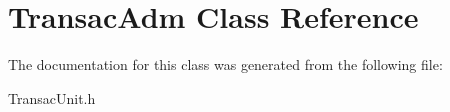 \hypertarget{classTransacAdm}{\section{Transac\-Adm Class Reference}
\label{da/deb/classTransacAdm}
}


The documentation for this class was generated from the following file\-:\begin{DoxyCompactItemize}
\item 
Transac\-Unit.\-h\end{DoxyCompactItemize}
